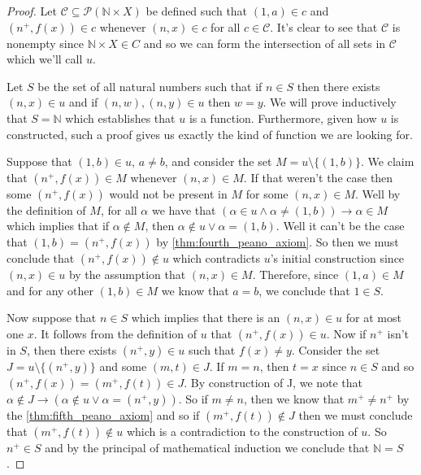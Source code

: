 \documentclass{article}
\theoremstyle{definition}
\theoremstyle{definition}
\theoremstyle{plain}
\theoremstyle{remark}
\theoremstyle{plain}
\theoremstyle{remark}
\theoremstyle{plain}
\theoremstyle{plain}
\theoremstyle{plain}
\begin{document}
\begin{proof}
Let \( \mathcal{C} \subseteq \mathcal{P} (\mathbb{N} \times X )\) be defined 
such that \( (1, a) \in c \) and \( (n^{+}, f(x)) \in c \) whenever 
\( ( n, x ) \in c \) for all \( c \in \mathcal{C} \). It's clear to see that 
\( \mathcal{C} \) is nonempty since \( \mathbb{N} \times X \in C \) and so we 
can form the intersection of all sets in \( \mathcal{C} \) which we'll call 
\( u \). 

Let \( S \) be the set of all natural numbers such that if 
\( n \in S \) then there exists \( (n, x) \in u \) and if 
\( (n, w), (n,y) \in u\) then \( w = y \). We will prove inductively that 
\( S = \mathbb{N} \) which establishes that \( u \) is a function. Furthermore, 
given how \( u \) is constructed, such a proof gives us exactly the kind of 
function we are looking for. 

Suppose that \( (1, b) \in u \), \( a \neq b\), and consider the set 
\( M = u \setminus \{ (1,b) \} \).  We claim that \( (n^{+}, f(x)) \in M \) 
whenever \( ( n, x ) \in M \). If that weren't the case then some 
\( (n^{+}, f(x)) \) would not be present in \( M \) for some \( (n,x) \in M \). 
Well by the definition of \( M \), for all \( \alpha \) we have that 
\( (\alpha \in u \land \alpha \neq (1,b)) \rightarrow \alpha \in M \) which 
implies that if \( \alpha \not\in M \), then 
\( \alpha \not\in u \lor \alpha = (1, b) \). Well  it can't be the case that 
\( (1,b) = (n^{+},f(x)) \) by \autoref{thm:fourth_peano_axiom}. So then we must 
conclude that \( (n^{+}, f(x)) \not\in u \) which 
contradicts \( u \)'s initial construction since \( (n,x) \in u \) by the 
assumption that \( (n,x) \in M \). Therefore, since \((1,a) \in M \) and for any 
other \( (1,b) \in M \) we know that \( a = b \), we conclude that 
\( 1 \in S \). 

Now suppose that \( n \in S \) which implies that there is an \( (n,x) \in u \) 
for at most one \( x \). It follows from the definition of \( u \) that 
\( (n^{+}, f(x)) \in u \). Now if \( n^{+} \) isn't in \( S \), then there 
exists \( (n^{+}, y) \in u \) such that \( f(x) \neq y \). Consider the set 
\( J = u \setminus \{(n^{+},y)\} \) and some \( (m, t) \in J \). If \( m = n \), 
then \( t = x \) since \( n \in S \) and so 
\( (n^{+}, f(x)) = (m^{+},f(t)) \in J \). By construction of J, we note that 
\( \alpha \not\in J \rightarrow (\alpha \not\in u \lor \alpha = (n^{+},y))\). 
So if \( m \neq n \), then we know that \( m^{+} \neq n^{+} \) by the 
\autoref{thm:fifth_peano_axiom} and so if \( (m^{+}, f(t)) \not\in J \) then we 
must conclude that \( (m^{+}, f(t)) \not\in u \) which is a contradiction to the 
construction of \( u \). So \( n^{+} \in S \) and by the principal of 
mathematical induction we conclude that \( \mathbb{N}  = S \). 
\end{proof}
\end{document}
